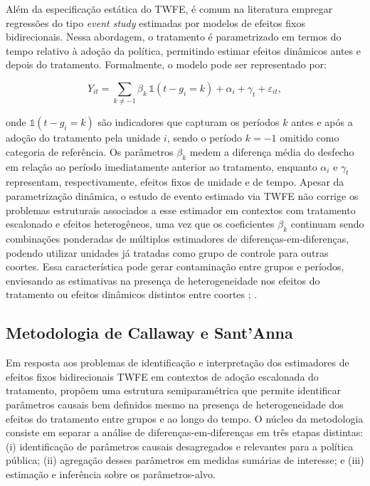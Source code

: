 \documentclass[12pt,a4paper,oneside]{article}
\begin{document}
Além da especificação estática do TWFE, é comum na literatura empregar regressões do tipo \textit{event study} estimadas por modelos de efeitos fixos bidirecionais. Nessa abordagem, o tratamento é parametrizado em termos do tempo relativo à adoção da política, permitindo estimar efeitos dinâmicos antes e depois do tratamento. Formalmente, o modelo pode ser representado por:

\begin{equation}
	Y_{it} = \sum_{k \neq -1} \beta_k \, \mathbb{1}(t - g_i = k) + \alpha_i + \gamma_t + \varepsilon_{it},
\end{equation}

onde $\mathbb{1}(t - g_i = k)$ são indicadores que capturam os períodos $k$ antes e após a adoção do tratamento pela unidade $i$, sendo o período $k=-1$ omitido como categoria de referência. Os parâmetros $\beta_k$ medem a diferença média do desfecho em relação ao período imediatamente anterior ao tratamento, enquanto $\alpha_i$ e $\gamma_t$ representam, respectivamente, efeitos fixos de unidade e de tempo. Apesar da parametrização dinâmica, o estudo de evento estimado via TWFE não corrige os problemas estruturais associados a esse estimador em contextos com tratamento escalonado e efeitos heterogêneos, uma vez que os coeficientes $\beta_k$ continuam sendo combinações ponderadas de múltiplos estimadores de diferenças-em-diferenças, podendo utilizar unidades já tratadas como grupo de controle para outras coortes. Essa característica pode gerar contaminação entre grupos e períodos, enviesando as estimativas na presença de heterogeneidade nos efeitos do tratamento ou efeitos dinâmicos distintos entre coortes \citep{DeChaisemartin2020}; \citep{Sun2021}.

	
		
\subsection{Metodologia de Callaway e Sant’Anna}

Em resposta aos problemas de identificação e interpretação dos estimadores de efeitos fixos bidirecionais TWFE em contextos de adoção escalonada do tratamento, \citet{Callaway2021} propõem uma estrutura semiparamétrica que permite identificar parâmetros causais bem definidos mesmo na presença de heterogeneidade dos efeitos do tratamento entre grupos e ao longo do tempo. O núcleo da metodologia consiste em separar a análise de diferenças-em-diferenças em três etapas distintas: (i) identificação de parâmetros causais desagregados e relevantes para a política pública; (ii) agregação desses parâmetros em medidas sumárias de interesse; e (iii) estimação e inferência sobre os parâmetros-alvo. 
\end{document}
